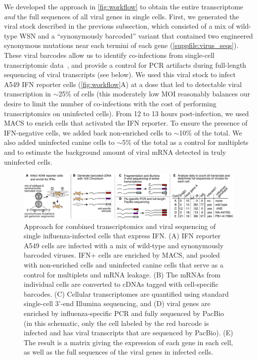 \documentclass[lineno]{asm-article}
\newcommand{\FIG}[1]{\autoref{fig:#1}}
\newcommand{\SUPPFILE}[1]{\autoref{suppfile:#1}}
\begin{document}
We developed the approach in \FIG{workflow} to obtain the entire transcriptome \emph{and} the full sequences of all viral genes in single cells.
First, we generated the viral stock described in the previous subsection, which consisted of a mix of wild-type WSN and a ``synonymously barcoded'' variant that contained two engineered synonymous mutations near each termini of each gene (\SUPPFILE{virus_seqs}).
These viral barcodes allow us to identify co-infections from single-cell transcriptomic data~\cite{russell2018extreme}, and provide a control for PCR artifacts during full-length sequencing of viral transcripts (see below).
We used this viral stock to infect A549 IFN reporter cells (\FIG{workflow}A) at a dose that led to detectable viral transcription in $\sim$25\% of cells (this moderately low MOI reasonably balances our desire to limit the number of co-infections with the cost of performing transcriptomics on uninfected cells).
From 12 to 13 hours post-infection, we used MACS to enrich cells that activated the IFN reporter.
To ensure the presence of IFN-negative cells, we added back non-enriched cells to $\sim$10\% of the total.
We also added uninfected canine cells to $\sim$5\% of the total as a control for multiplets and to estimate the background amount of viral mRNA detected in truly uninfected cells.

\begin{figure}
\begin{fullwidth}

\includegraphics[width=\linewidth, valign=t]{figures/WorkflowSchematic/SchematicForPaper.pdf}

\caption{
Approach for combined transcriptomics and viral sequencing of single influenza-infected cells that express IFN.
(A)
IFN reporter A549 cells are infected with a mix of wild-type and synonymously barcoded viruses.
IFN+ cells are enriched by MACS, and pooled with non-enriched cells and uninfected canine cells that serve as a control for multiplets and mRNA leakage.
(B)
The mRNAs from individual cells are converted to cDNAs tagged with cell-specific barcodes.
(C)
Cellular transcriptomes are quantified using standard single-cell 3'-end Illumina sequencing, and 
(D)
viral genes are enriched by influenza-specific PCR and fully sequenced by PacBio (in this schematic, only the cell labeled by the red barcode is infected and has viral transcripts that are sequenced by PacBio).
(E)
The result is a matrix giving the expression of each gene in each cell, as well as the full sequences of the viral genes in infected cells.
}
\label{fig:workflow}

\end{fullwidth}
\end{figure}
\end{document}
